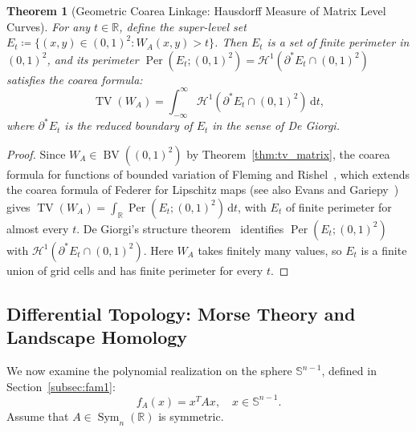 \documentclass[11pt,a4paper,reqno]{amsart}
\newtheorem{theorem}{Theorem}[section]
\theoremstyle{definition}
\numberwithin{equation}{section}
\newcommand{\R}{\mathbb{R}}
\newcommand{\Sph}{\mathbb{S}}
\newcommand{\BV}{\operatorname{BV}}
\newcommand{\TV}{\operatorname{TV}}
\newcommand{\Per}{\operatorname{Per}}
\newcommand{\dif}{\,\mathrm{d}}
\begin{document}
\begin{theorem}[Geometric Coarea Linkage: Hausdorff Measure of Matrix Level Curves]
\label{thm:coarea_linkage}
For any $t \in \R$, define the super-level set $E_t \coloneqq \{(x, y) \in (0, 1)^2 \colon W_A(x, y) > t\}$. Then $E_t$ is a set of finite perimeter in $(0, 1)^2$, and its perimeter $\Per(E_t; (0,1)^2) = \mathcal{H}^1(\partial^* E_t \cap (0,1)^2)$ satisfies the \emph{coarea formula}:
\begin{equation}
    \label{eq:coarea}
    \TV(W_A) = \int_{-\infty}^\infty \mathcal{H}^1(\partial^* E_t \cap (0,1)^2) \dif t,
\end{equation}
where $\partial^* E_t$ is the reduced boundary of $E_t$ in the sense of De Giorgi.
\end{theorem}
\begin{proof}
Since $W_A \in \BV((0,1)^2)$ by Theorem~\ref{thm:tv_matrix}, the coarea formula for functions of bounded variation of Fleming and Rishel~\cite{fleming1960integral}, which extends the coarea formula of Federer for Lipschitz maps \cite[Thm.~3.1]{federer1959curvature} (see also Evans and Gariepy~\cite[Ch.~5]{evans2015measure}) gives $\TV(W_A) = \int_{\R} \Per(E_t;(0,1)^2) \dif t$, with $E_t$ of finite perimeter for almost every $t$. De Giorgi's structure theorem~\cite[Ch.~5]{evans2015measure} identifies $\Per(E_t;(0,1)^2)$ with $\mathcal{H}^1(\partial^* E_t \cap (0,1)^2)$. Here $W_A$ takes finitely many values, so $E_t$ is a finite union of grid cells and has finite perimeter for every $t$.
\end{proof}

\subsection{Differential Topology: Morse Theory and Landscape Homology}
\label{subsec:morse}

We now examine the polynomial realization on the sphere $\Sph^{n-1}$, defined in Section~\ref{subsec:fam1}:
\begin{equation}
    f_A(x) = x^T A x, \quad x \in \Sph^{n-1}.
\end{equation}
Assume that $A \in \operatorname{Sym}_n(\R)$ is symmetric.
\end{document}
